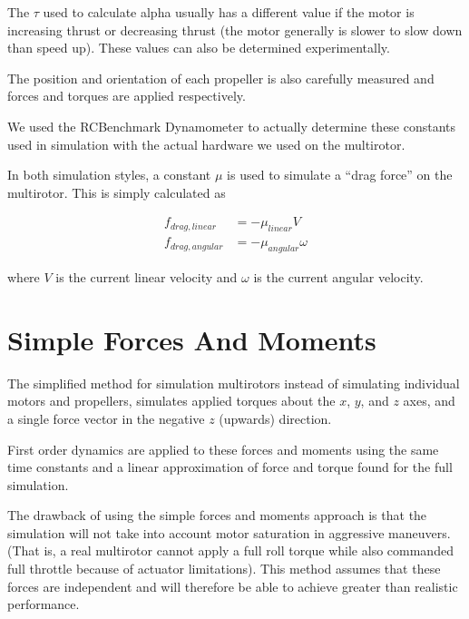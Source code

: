 \documentclass{article}
\begin{document}
The $\tau$ used to calculate alpha usually has a different value if the motor is increasing thrust or decreasing thrust (the motor generally is slower to slow down than speed up). These values can also be determined experimentally.

The position and orientation of each propeller is also carefully measured and forces and torques are applied respectively.

We used the RCBenchmark Dynamometer to actually determine these constants used in simulation with the actual hardware we used on the multirotor.

In both simulation styles, a constant $\mu$ is used to simulate a ``drag force'' on the multirotor.  This is simply calculated as 

\begin{equation}
\begin{aligned}
	f_{drag,linear} &= -\mu_{linear} V \\
	f_{drag,angular} &= -\mu_{angular} \omega
	\end{aligned}
\end{equation}

where $V$ is the current linear velocity and $\omega$ is the current angular velocity.

\section{Simple Forces And Moments}
The simplified method for simulation multirotors instead of simulating individual motors and propellers, simulates applied torques about the $x$, $y$, and $z$ axes, and a single force vector in the negative $z$ (upwards) direction.

First order dynamics are applied to these forces and moments using the same time constants and a linear approximation of force and torque found for the full simulation.

The drawback of using the simple forces and moments approach is that the simulation will not take into account motor saturation in aggressive maneuvers.  (That is, a real multirotor cannot apply a full roll torque while also commanded full throttle because of actuator limitations).  This method assumes that these forces are independent and will therefore be able to achieve greater than realistic performance.
\end{document}
